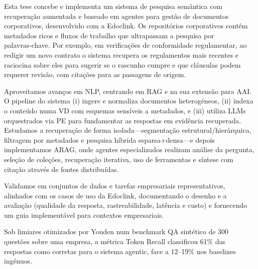 \glsresetall
\noindent
Esta tese concebe e implementa um sistema de pesquisa semântica com recuperação aumentada e baseado em agentes para gestão de documentos corporativos, desenvolvido com a Edoclink. Os repositórios corporativos contêm metadados ricos e fluxos de trabalho que ultrapassam a pesquisa por palavras‑chave. Por exemplo, em verificações de conformidade regulamentar, ao redigir um novo contrato o sistema recupera os regulamentos mais recentes e raciocina sobre eles para sugerir se o rascunho cumpre e que cláusulas podem requerer revisão, com citações para as passagens de origem.

Aproveitamos avanços em \gls{NLP}, centrando em \gls{RAG} e na sua extensão para \gls{AAI}. O pipeline do sistema (i) ingere e normaliza documentos heterogéneos, (ii) indexa o conteúdo numa \gls{VD} com esquemas sensíveis a metadados, e (iii) utiliza \glspl{LLM} orquestrados via \gls{PE} para fundamentar as respostas em evidência recuperada. Estudamos a recuperação de forma isolada—segmentação estrutural/hierárquica, filtragem por metadados e pesquisa híbrida esparsa+densa—e depois implementamos \gls{ARAG}, onde agentes especializados realizam análise da pergunta, seleção de coleções, recuperação iterativa, uso de ferramentas e síntese com citação através de fontes distribuídas.

Validamos em conjuntos de dados e tarefas empresariais representativos, alinhados com os casos de uso da Edoclink, documentando o desenho e a avaliação (qualidade da resposta, rastreabilidade, latência e custo) e fornecendo um guia implementável para contextos empresariais.

Sob limiares otimizados por Youden num benchmark \gls{QA} sintético de 300 questões sobre uma empresa, a métrica Token Recall classificou 61\% das respostas como corretas para o sistema agentic, face a 12–19\% nos baselines ingénuos.





